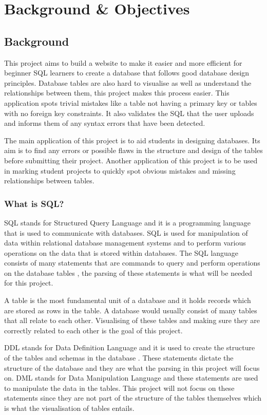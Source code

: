
\chapter{Background \& Objectives}

\section{Background}

This project aims to build a website to make it easier and more efficient for beginner SQL learners to create a database that follows good database design principles. Database tables are also hard to visualise as well as understand the relationships between them, this project makes this process easier. This application spots trivial mistakes like a table not having a primary key or tables with no foreign key constraints. It also validates the SQL that the user uploads and informs them of any syntax errors that have been detected.

The main application of this project is to aid students in designing databases. Its aim is to find any errors or possible flaws in the structure and design of the tables before submitting their project. Another application of this project is to be used in marking student projects to quickly spot obvious mistakes and missing relationships between tables.

\subsection{What is SQL?}

SQL stands for Structured Query Language and it is a programming language that is used to communicate with databases. SQL is used for manipulation of data within relational database management systems and to perform various operations on the data that is stored within databases. The SQL language consists of many statements that are commands to query and perform operations on the database tables \cite{SQL}, the parsing of these statements is what will be needed for this project.

A table is the most fundamental unit of a database and it holds records which are stored as rows in the table. A database would usually consist of many tables that all relate to each other. Visualising of these tables and making sure they are correctly related to each other is the goal of this project.

DDL stands for Data Definition Language and it is used to create the structure of the tables and schemas in the database \cite{ddlAndDml}. These statements dictate the structure of the database and they are what the parsing in this project will focus on. DML stands for Data Manipulation Language and these statements are used to manipulate the data in the tables. This project will not focus on these statements since they are not part of the structure of the tables themselves which is what the visualisation of tables entails.

